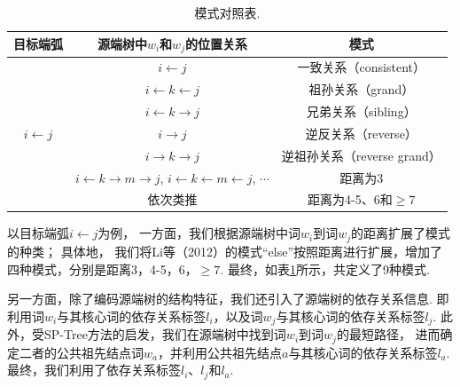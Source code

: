 \begin{table}[hb]
    \centering
    \caption{模式对照表. }
    \label{tb:pattern_table}
    \begin{tabular}{c|cc}
        \hline
        目标端弧                          & 源端树中$w_i$和$w_j$的位置关系                                                                     & 模式                        \\
        \hline
        \multirow{7}{*}{$i \leftarrow j$} & $i \leftarrow j$                                                                                   & 一致关系（consistent）      \\
                                          & $i \leftarrow k \leftarrow j$                                                                      & 祖孙关系（grand）           \\
                                          & $i \leftarrow k \rightarrow j$                                                                     & 兄弟关系（sibling）         \\
                                          & $i \rightarrow j$                                                                                  & 逆反关系（reverse）         \\
                                          & $i \rightarrow k \rightarrow j$                                                                    & 逆祖孙关系（reverse grand） \\
                                          & $i \leftarrow k \rightarrow m \rightarrow j$, $i \leftarrow k \leftarrow m \leftarrow j$, $\cdots$ & 距离为3                     \\
                                          & 依次类推                                                                                           & 距离为4-5、6和$\geq 7$      \\
        \hline
    \end{tabular}
\end{table}

以目标端弧$i \leftarrow j$为例，
一方面，我们根据源端树中词$w_i$到词$w_j$的距离扩展了模式的种类；
具体地， 我们将Li等（2012）的模式“else”按照距离进行扩展，增加了四种模式，分别是距离3，4-5，6，$\geq 7$. 最终，如表\ref{tb:pattern_table}所示，共定义了9种模式.

另一方面，除了编码源端树的结构特征，我们还引入了源端树的依存关系信息.
即利用词$w_i$与其核心词的依存关系标签$l_i$，以及词$w_j$与其核心词的依存关系标签$l_j$.
此外，受SP-Tree方法的启发，我们在源端树中找到词$w_i$到词$w_j$的最短路径，
进而确定二者的公共祖先结点词$w_a$，并利用公共祖先结点$a$与其核心词的依存关系标签$l_a$.
最终，我们利用了依存关系标签$l_i$、$l_j$和$l_a$.

